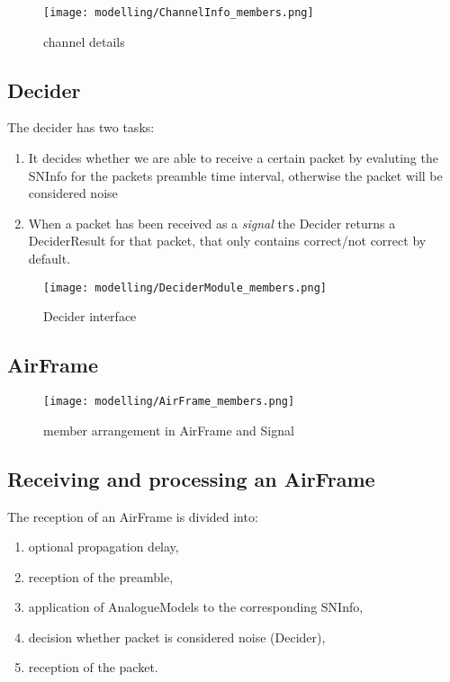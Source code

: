 \begin{figure}[H]
 \centering
 \texttt{[image: modelling/ChannelInfo\_members.png]}
 \caption{channel details}
 \label{fig: channel details}
\end{figure}

\newpage


\subsection{Decider}

The decider has two tasks:
\begin{enumerate}
	\item It decides whether we are able to receive a certain packet by evaluting
	the SNInfo for the packets preamble time interval, otherwise the packet will 	be considered noise
	\item When a packet has been received as a \textit{signal} the Decider 	returns a DeciderResult for that packet, that only contains correct/not correct 	by default.
\end{enumerate}


\begin{figure}[H]
 \centering
 \texttt{[image: modelling/DeciderModule\_members.png]}
 \caption{Decider interface}
 \label{fig: Decider interface}
\end{figure}
\newpage

\subsection{AirFrame}


\begin{figure}[H]
 \centering
 \texttt{[image: modelling/AirFrame\_members.png]}
 \caption{member arrangement in AirFrame and Signal}
 \label{fig: member AirFrame}
\end{figure}
\newpage


\subsection{Receiving and processing an AirFrame}

The reception of an AirFrame is divided into:
\begin{enumerate}
	
	\item optional propagation delay,
	\item reception of the preamble,
	\item application of AnalogueModels to the corresponding SNInfo,
	\item decision whether packet is considered noise (Decider),
	\item reception of the packet.
\end{enumerate}

